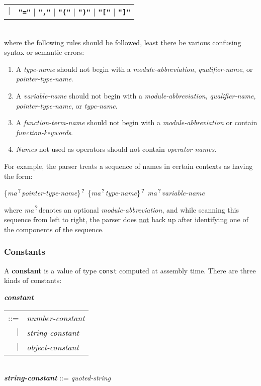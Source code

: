 \documentclass[12pt]{article}
\newcommand{\TT}[1]{{\tt \bfseries #1}}
\newcommand{\QMARK}{{$^{\,\mbox{\footnotesize ?}}$}}
\newcommand{\MA}{{\em ma}\QMARK}
\newcommand{\key}[1]{{\rm \bfseries #1}}
\newcommand{\emkey}[1]{{\em \bfseries #1}}
\newenvironment{indpar}[1][0.3in]%
	{\begin{list}{}%
		     {\setlength{\itemsep}{0in}%
		      \setlength{\topsep}{0in}%
		      \setlength{\parsep}{1ex}%
		      \setlength{\labelwidth}{#1}%
		      \setlength{\leftmargin}{#1}%
		      \addtolength{\leftmargin}{\labelsep}}%
	 \item}%
	{\end{list}}
\begin{document}
\begin{indpar}
\begin{tabular}[t]{rl}
    $|$ & \TT{"="} $|$ \TT{","} $|$ \TT{"("} $|$ \TT{")"} $|$
          \TT{"["} $|$ \TT{"]"}
    \end{tabular}
\\[1ex]
where the following rules should be followed, least there be
various confusing syntax or semantic errors:
\begin{enumerate}
\item
A {\em type-name} should not begin with a {\em module-abbreviation},
{\em qualifier-name}, or {\em pointer-type-name}.
\item
\label{VARIABLE-NAME-RULE}
A {\em variable-name} should not begin with a {\em module-abbreviation},
{\em qualifier-name}, {\em pointer-type-name}, or {\em type-name}.
\item
A {\em function-term-name} should not begin with a {\em module-abbreviation}
or contain {\em function-keywords}.
\item
{\em Names} not used as operators should not contain {\em operator-names}.
\end{enumerate}
\end{indpar}

For example,
the parser treats a sequence of
names in certain contexts as having the form:
\begin{center}
\{\MA {\em pointer-type-name}\}\QMARK{}
\{\MA {\em type-name}\}\QMARK{}
\MA {\em variable-name}
\end{center}
where \MA denotes an optional {\em module-abbreviation},
and while scanning this sequence from left to right,
the parser does \underline{not} back up after identifying
one of the components of the sequence.

\subsubsection{Constants}
\label{CONSTANTS}

A \key{constant} is a value of type {\tt const} computed at
assembly time.  There are three kinds of constants:

\begin{indpar}
\emkey{constant}
    \begin{tabular}[t]{rl}
    ::= & {\em number-constant} \\
    $|$ & {\em string-constant} \\
    $|$ & {\em object-constant} \\
    \end{tabular} \\
\emkey{string-constant} ::= {\em quoted-string}
\end{indpar}
\end{document}
